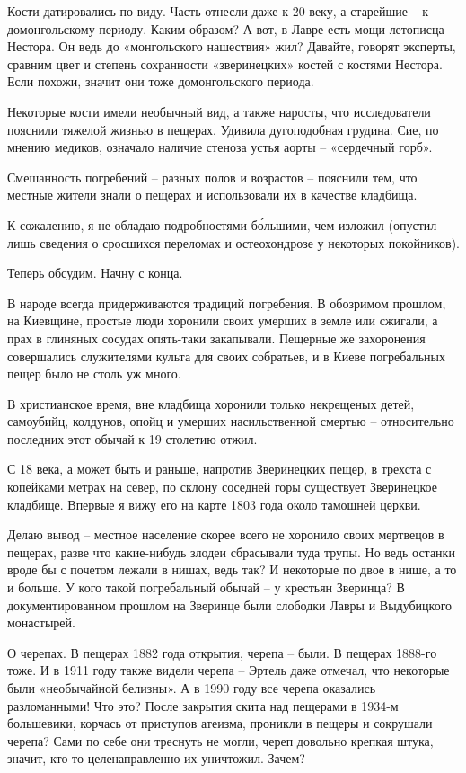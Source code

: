 Кости датировались по виду. Часть отнесли даже к 20 веку, а старейшие – к домонгольскому периоду. Каким образом? А вот, в Лавре есть мощи летописца Нестора. Он ведь до «монгольского нашествия» жил? Давайте, говорят эксперты, сравним цвет и степень сохранности «зверинецких» костей с костями Нестора. Если похожи, значит они тоже домонгольского периода.

Некоторые кости имели необычный вид, а также наросты, что исследователи пояснили тяжелой жизнью в пещерах. Удивила дугоподобная грудина. Сие, по мнению медиков, означало наличие стеноза устья аорты – «сердечный горб».

Смешанность погребений – разных полов и возрастов – пояснили тем, что местные жители знали о пещерах и использовали их в качестве кладбища.

К сожалению, я не обладаю подробностями б\'ольшими, чем изложил (опустил лишь сведения о сросшихся переломах и остеохондрозе у некоторых покойников).

Теперь обсудим. Начну с конца. 

В народе всегда придерживаются традиций погребения. В обозримом прошлом, на Киевщине, простые люди хоронили своих умерших в земле или сжигали, а прах в глиняных сосудах опять-таки закапывали. Пещерные же захоронения совершались служителями культа для своих собратьев, и в Киеве погребальных пещер было не столь уж много.

В христианское время, вне кладбища хоронили только некрещеных детей, самоубийц, колдунов, опойц и умерших насильственной смертью – относительно последних этот обычай к 19 столетию отжил.

С 18 века, а может быть и раньше, напротив Зверинецких пещер, в трехста с копейками метрах на север, по склону соседней горы существует Зверинецкое кладбище. Впервые я вижу его на карте 1803 года около тамошней церкви.

Делаю вывод – местное население скорее всего не хоронило своих мертвецов в пещерах, разве что какие-нибудь злодеи сбрасывали туда трупы. Но ведь останки вроде бы с почетом лежали в нишах, ведь так? И некоторые по двое в нише, а то и больше. У кого такой погребальный обычай – у крестьян Зверинца? В документированном прошлом на Зверинце были слободки Лавры и Выдубицкого монастырей.

О черепах. В пещерах 1882 года открытия, черепа – были. В пещерах 1888-го тоже. И в 1911 году также видели черепа – Эртель даже отмечал, что некоторые были «необычайной белизны». А в 1990 году все черепа оказались разломанными! Что это? После закрытия скита над пещерами в 1934-м большевики, корчась от приступов атеизма, проникли в пещеры и сокрушали черепа? Сами по себе они треснуть не могли, череп довольно крепкая штука, значит, кто-то целенаправленно их уничтожил. Зачем?

